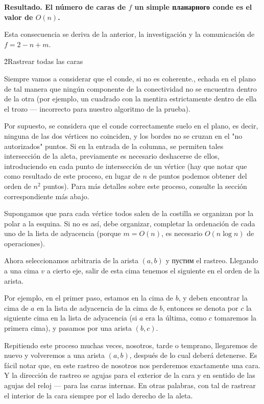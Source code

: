 \bf{Resultado}. El número de caras de $f$ un simple планарного conde es el valor de $O(n)$.

Esta consecuencia se deriva de la anterior, la investigación y la comunicación de $f = 2 - n + m$.


\h2{Rastrear todas las caras}

Siempre vamos a considerar que el conde, si no es coherente., echada en el plano de tal manera que ningún componente de la conectividad no se encuentra dentro de la otra (por ejemplo, un cuadrado con la mentira estrictamente dentro de ella el trozo --- incorrecto para nuestro algoritmo de la prueba).

Por supuesto, se considera que el conde correctamente suelo en el plano, es decir, ninguna de las dos vértices no coinciden, y los bordes no se cruzan en el "no autorizados" puntos. Si en la entrada de la columna, se permiten tales intersección de la aleta, previamente es necesario deshacerse de ellos, introduciendo en cada punto de intersección de un vértice (hay que notar que como resultado de este proceso, en lugar de $n$ de puntos podemos obtener del orden de $n^2$ puntos). Para más detalles sobre este proceso, consulte la sección correspondiente más abajo.

Supongamos que para cada vértice todos salen de la costilla se organizan por la polar a la esquina. Si no es así, debe organizar, completar la ordenación de cada uno de la lista de adyacencia (porque $m = O(n)$, es necesario $O (n \log n)$ de operaciones).

Ahora seleccionamos arbitraria de la arista $(a,b)$ y пустим el rastreo. Llegando a una cima $v$ a cierto eje, salir de esta cima tenemos el siguiente en el orden de la arista.

Por ejemplo, en el primer paso, estamos en la cima de $b$, y deben encontrar la cima de $a$ en la lista de adyacencia de la cima de $b$, entonces se denota por $c$ la siguiente cima en la lista de adyacencia (si $a$ era la última, como $c$ tomaremos la primera cima), y pasamos por una arista $(b,c)$.

Repitiendo este proceso muchas veces, nosotros, tarde o temprano, llegaremos de nuevo y volveremos a una arista $(a,b)$, después de lo cual deberá detenerse. Es fácil notar que, en este rastreo de nosotros nos perderemos exactamente una cara. Y la dirección de rastreo se agujas para el exterior de la cara y en sentido de las agujas del reloj --- para las caras internas. En otras palabras, con tal de rastrear el interior de la cara siempre por el lado derecho de la aleta.

